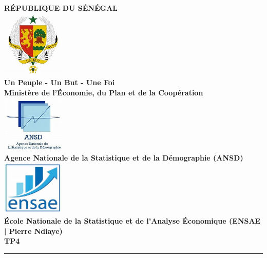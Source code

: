 \documentclass[
]{article}
\author{}
\date{\vspace{-2.5em}}
\begin{document}
\begin{titlepage}
    \begin{center}
        \sffamily 
        {\Large \textbf{RÉPUBLIQUE DU SÉNÉGAL}}\\[0.3cm]
        \includegraphics[width=3cm]{LOGO3.jpg} \\[0.3cm]
        
        {\large \textbf{Un Peuple - Un But - Une Foi}}\\[0.5cm]
        
        {\Large \textbf{Ministère de l'Économie, du Plan et de la Coopération}}\\[0.5cm]
        
        \includegraphics[width=3cm]{LOGO2.jpg} \\[0.3cm]
        
        {\Large \textbf{Agence Nationale de la Statistique et de la Démographie (ANSD)}}\\[0.5cm]
        
        \includegraphics[width=3cm]{LOGO1.jpg} \\[0.3cm]
        
        {\LARGE \textbf{École Nationale de la Statistique et de l'Analyse Économique (ENSAE | Pierre Ndiaye)}}\\[0.8cm]
        
        \textbf{\Huge \color{blue} TP4}\\[0.6cm]
        \rule{\linewidth}{0.6mm} \\[1cm]
        
        \vfill  
        

\end{center}
\end{titlepage}
\end{document}
